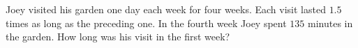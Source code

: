 Joey visited his garden one day each week for four weeks. Each visit lasted $1.5$ times as long as the preceding one. In the fourth week Joey spent $135$ minutes in the garden. How long was his visit in the first week?

